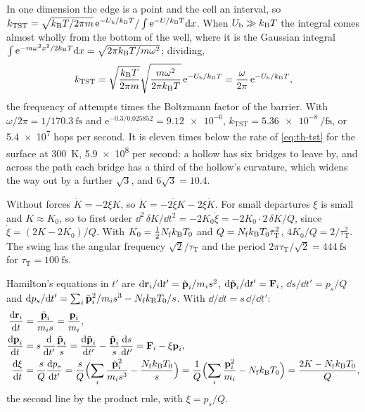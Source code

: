 In one dimension the edge is a point and the
cell an interval, so $k_{\mathrm{TST}} = \sqrt{k_{\mathrm{B}} T/2\pi m}\,
\mathrm{e}^{-U_{\mathrm b}/k_{\mathrm{B}} T}/\int\mathrm{e}^{-U/k_{\mathrm{B}} T}\mathrm{d} x$. When
$U_{\mathrm b} \gg k_{\mathrm{B}} T$ the integral comes almost wholly from the bottom
of the well, where it is the Gaussian integral $\int\mathrm{e}^{-m\omega^2
x^2/2k_{\mathrm{B}} T}\mathrm{d} x = \sqrt{2\pi k_{\mathrm{B}} T/m\omega^2}$; dividing,
\begin{equation*}
   k_{\mathrm{TST}} = \sqrt{\frac{k_{\mathrm{B}} T}{2\pi m}}\sqrt{\frac{m\omega^2}{2\pi
   k_{\mathrm{B}} T}}\,\mathrm{e}^{-U_{\mathrm b}/k_{\mathrm{B}} T}
   = \frac{\omega}{2\pi}\,\mathrm{e}^{-U_{\mathrm b}/k_{\mathrm{B}} T} ,
\end{equation*}
the frequency of attempts times the Boltzmann factor of the barrier. With
$\omega/2\pi = 1/\SI{170.3}{\femto\second}$ and $\mathrm{e}^{-0.3/0.025852}
= \num{9.12e-6}$, $k_{\mathrm{TST}} = \SI{5.36e-8}{\per\femto\second}$, or
\num{5.4e7} hops per second. It is eleven times below the rate of
\cref{eq:th-tst} for the surface at \SI{300}{\kelvin}, \num{5.9e8} per
second: a hollow has six bridges to leave by, and across the path each
bridge has a third of the hollow's curvature, which widens the way out by
a further $\sqrt3$, and $6\sqrt3 = 10.4$.

Without forces $\dot K = -2\xi K$, so
$\ddot K = -2\dot\xi K - 2\xi\dot K$. For small departures $\xi$ is small
and $K \approx K_0$, so to first order $\dd^2\,\delta K/\dd t^2 =
-2K_0\dot\xi = -2K_0\cdot2\,\delta K/Q$, since $\dot\xi = (2K -
2K_0)/Q$. With $K_0 = \frac12N_{\mathrm f}k_{\mathrm{B}} T_0$ and $Q =
N_{\mathrm f}k_{\mathrm{B}} T_0\tau_{\mathrm T}^2$, $4K_0/Q = 2/\tau_{\mathrm T}^2$. The
swing has the angular frequency $\sqrt2/\tau_{\mathrm T}$ and the period
$2\pi\tau_{\mathrm T}/\sqrt2 = \SI{444}{\femto\second}$ for $\tau_{\mathrm
T} = \SI{100}{\femto\second}$.

Hamilton's equations in $t'$ are $\mathrm{d}\bm{\mathrm{r}}_i/\mathrm{d}
t' = \tilde{\bm{\mathrm{p}}}_i/m_is^2$, $\mathrm{d}\tilde{\bm{\mathrm{p}}}_i/\mathrm{d} t' = \bm{\mathrm{F}}_i$,
$\dd s/\dd t' = p_s/Q$ and $\mathrm{d} p_s/\mathrm{d} t' = \sum_i\tilde{\bm{\mathrm{p}}}_i^2/m_i
s^3 - N_{\mathrm f}k_{\mathrm{B}} T_0/s$. With $\dd/\dd t = s\,\dd/\dd t'$:
\begin{align*}
   \frac{\mathrm{d}\bm{\mathrm{r}}_i}{\mathrm{d} t} &= \frac{\tilde{\bm{\mathrm{p}}}_i}{m_is}
   = \frac{\bm{\mathrm{p}}_i}{m_i} ,\\
   \frac{\mathrm{d}\bm{\mathrm{p}}_i}{\mathrm{d} t} &= s\,\frac{\mathrm{d}}{\mathrm{d} t'}\frac{\tilde{
   \bm{\mathrm{p}}}_i}{s} = \frac{\mathrm{d}\tilde{\bm{\mathrm{p}}}_i}{\mathrm{d} t'} - \frac{\tilde{
   \bm{\mathrm{p}}}_i}{s}\frac{\mathrm{d} s}{\mathrm{d} t'} = \bm{\mathrm{F}}_i - \xi\bm{\mathrm{p}}_i ,\\
   \frac{\mathrm{d}\xi}{\mathrm{d} t} &= \frac{s}{Q}\frac{\mathrm{d} p_s}{\mathrm{d} t'}
   = \frac{s}{Q}\Bigl(\sum_i\frac{\tilde{\bm{\mathrm{p}}}_i^2}{m_is^3}
   - \frac{N_{\mathrm f}k_{\mathrm{B}} T_0}{s}\Bigr)
   = \frac{1}{Q}\Bigl(\sum_i\frac{\bm{\mathrm{p}}_i^2}{m_i} - N_{\mathrm f}k_{\mathrm{B}}
   T_0\Bigr) = \frac{2K - N_{\mathrm f}k_{\mathrm{B}} T_0}{Q} ,
\end{align*}
the second line by the product rule, with $\xi = p_s/Q$.

